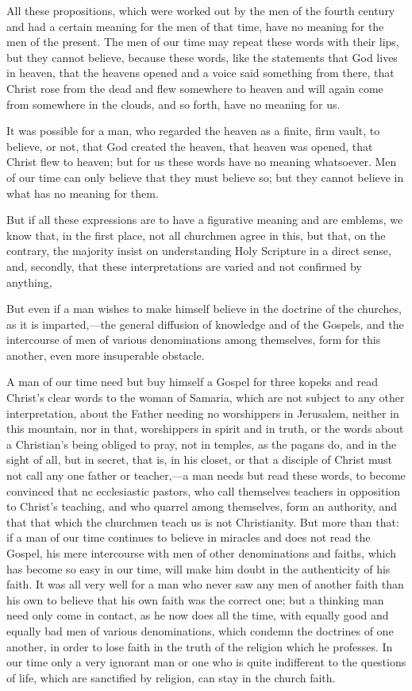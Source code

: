 \documentclass{book}
\begin{document}
All these propositions, which were worked out by the men of the fourth century and had a certain meaning for the men of that time, have no meaning for the men of the present. The men of our time may repeat these words with their lips, but they cannot believe, because these words, like the statements that God lives in heaven, that the heavens opened and a voice said something from there, that Christ rose from the dead and flew somewhere to heaven and will again come from somewhere in the clouds, and so forth, have no meaning for us.

It was possible for a man, who regarded the heaven as a finite, firm vault, to believe, or not, that God created the heaven, that heaven was opened, that Christ flew to heaven; but for us these words have no meaning whatsoever. Men of our time can only believe that they must believe so; but they cannot believe in what has no meaning for them.

But if all these expressions are to have a figurative meaning and are emblems, we know that, in the first place, not all churchmen agree in this, but that, on the contrary, the majority insist on understanding Holy Scripture in a direct sense, and, secondly, that these interpretations are varied and not confirmed by anything,

But even if a man wishes to make himself believe in the doctrine of the churches, as it is imparted,—the general diffusion of knowledge and of the Gospels, and the intercourse of men of various denominations among themselves, form for this another, even more insuperable obstacle.

A man of our time need but buy himself a Gospel for three kopeks and read Christ’s clear words to the woman of Samaria, which are not subject to any other interpretation, about the Father needing no worshippers in Jerusalem, neither in this mountain, nor in that, worshippers in spirit and in truth, or the words about a Christian’s being obliged to pray, not in temples, as the pagans do, and in the sight of all, but in secret, that is, in his closet, or that a disciple of Christ must not call any one father or teacher,—a man needs but read these words, to become convinced that nc ecclesiastic pastors, who call themselves teachers in opposition to Christ’s teaching, and who quarrel among themselves, form an authority, and that that which the churchmen teach us is not Christianity. But more than that: if a man of our time continues to believe in miracles and does not read the Gospel, his mere intercourse with men of other denominations and faiths, which has become so easy in our time, will make him doubt in the authenticity of his faith. It was all very well for a man who never saw any men of another faith than his own to believe that his own faith was the correct one; but a thinking man need only come in contact, as he now does all the time, with equally good and equally bad men of various denominations, which condemn the doctrines of one another, in order to lose faith in the truth of the religion which he professes. In our time only a very ignorant man or one who is quite indifferent to the questions of life, which are sanctified by religion, can stay in the church faith.
\end{document}

